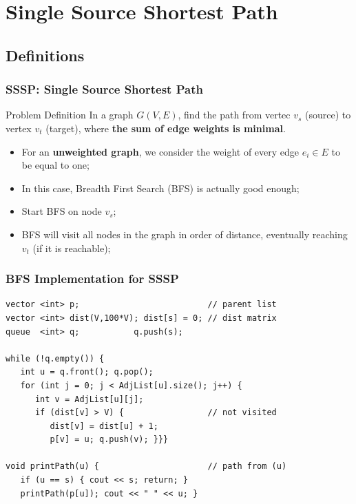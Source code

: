 \section{Single Source Shortest Path}

\subsection{Definitions}
\begin{frame}
  \frametitle{SSSP: Single Source Shortest Path}
  \begin{block}{Problem Definition}
    In a graph $G(V,E)$, find the path from vertec $v_s$ (source) to vertex $v_t$ (target), where {\bf the sum of edge weights is minimal}.
  \end{block}\bigskip

  \begin{itemize}
  \item For an {\bf unweighted graph}, we consider the weight of every edge $e_i \in E$ to be equal to one;\medskip

  \item In this case, Breadth First Search (BFS) is actually good enough;\medskip

  \item Start BFS on node $v_s$;\medskip

  \item BFS will visit all nodes in the graph in order of distance, eventually reaching $v_t$ (if it is reachable);
  \end{itemize}
\end{frame}

\begin{frame}[fragile]
  \frametitle{BFS Implementation for SSSP}

{\smaller
\begin{exampleblock}{}
\begin{verbatim}
vector <int> p;                          // parent list
vector <int> dist(V,100*V); dist[s] = 0; // dist matrix
queue  <int> q;           q.push(s);

while (!q.empty()) {
   int u = q.front(); q.pop();
   for (int j = 0; j < AdjList[u].size(); j++) {
      int v = AdjList[u][j];
      if (dist[v] > V) {                 // not visited
         dist[v] = dist[u] + 1;
         p[v] = u; q.push(v); }}}

void printPath(u) {                      // path from (u)
   if (u == s) { cout << s; return; }
   printPath(p[u]); cout << " " << u; }
\end{verbatim}
\end{exampleblock}
}
\end{frame}

